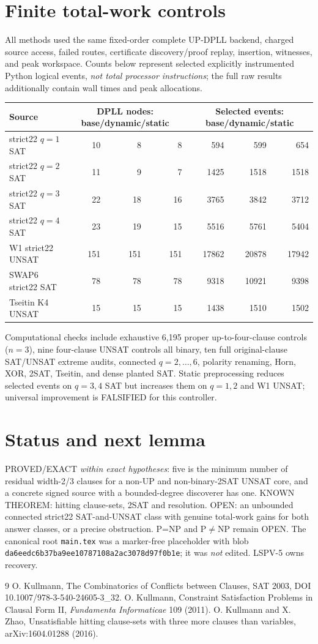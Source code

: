 \documentclass{article}
\begin{document}
\section{Finite total-work controls}
All methods used the same fixed-order complete UP-DPLL backend, charged source access, failed routes, certificate discovery/proof replay, insertion, witnesses, and peak workspace. Counts below represent selected explicitly instrumented Python logical events, \emph{not total processor instructions}; the full raw results additionally contain wall times and peak allocations.
\begin{center}\begin{tabular}{lrrrrrr}\toprule
Source&\multicolumn{3}{c}{DPLL nodes: base/dynamic/static}&\multicolumn{3}{c}{Selected events: base/dynamic/static}\\\midrule
strict22 $q=1$ SAT&10&8&8&594&599&654\\
strict22 $q=2$ SAT&11&9&7&1425&1518&1518\\
strict22 $q=3$ SAT&22&18&16&3765&3842&3712\\
strict22 $q=4$ SAT&23&19&15&5516&5761&5404\\
W1 strict22 UNSAT&151&151&151&17862&20878&17942\\
SWAP6 strict22 SAT&78&78&78&9318&10921&9398\\
Tseitin K4 UNSAT&15&15&15&1438&1510&1502\\\bottomrule
\end{tabular}\end{center}
Computational checks include exhaustive 6,195 proper up-to-four-clause controls ($n=3$), nine four-clause UNSAT controls all binary, ten full original-clause SAT/UNSAT extreme audits, connected $q=2,\dots,6$, polarity renaming, Horn, XOR, 2SAT, Tseitin, and dense planted SAT. Static preprocessing reduces selected events on $q=3,4$ SAT but increases them on $q=1,2$ and W1 UNSAT; universal improvement is FALSIFIED for this controller.
\section{Status and next lemma}
PROVED/EXACT \emph{within exact hypotheses}: five is the minimum number of residual width-2/3 clauses for a non-UP and non-binary-2SAT UNSAT core, and a concrete signed source with a bounded-degree discoverer has one. KNOWN THEOREM: hitting clause-sets, 2SAT and resolution. OPEN: an unbounded connected strict22 SAT-and-UNSAT class with genuine total-work gains for both answer classes, or a precise obstruction. P=NP and P$\ne$NP remain OPEN.
The canonical root \texttt{main.tex} was a marker-free placeholder with blob \texttt{da6eedc6b37ba9ee10787108a2ac3078d97f0b1e}; it was \emph{not} edited. LSPV-5 owns recovery.
\begin{thebibliography}{9}
 O. Kullmann, The Combinatorics of Conflicts between Clauses, SAT 2003, DOI 10.1007/978-3-540-24605-3\_32.
 O. Kullmann, Constraint Satisfaction Problems in Clausal Form II, \emph{Fundamenta Informaticae} 109 (2011).
 O. Kullmann and X. Zhao, Unsatisfiable hitting clause-sets with three more clauses than variables, arXiv:1604.01288 (2016).
\end{thebibliography}
\end{document}
